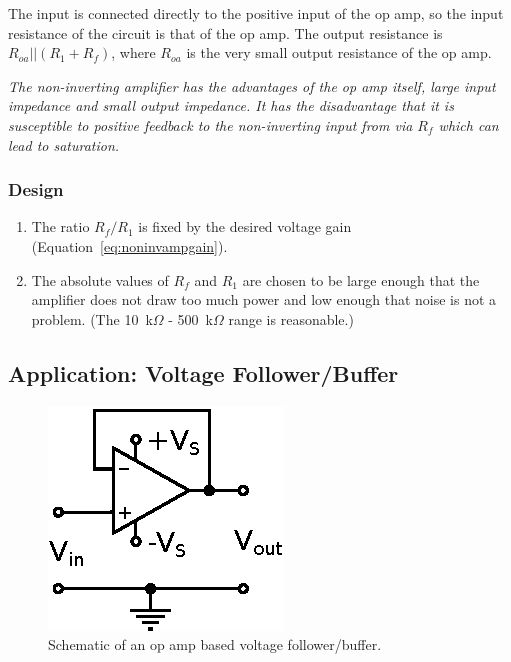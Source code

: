 \documentclass[11pt]{article}
\begin{document}
The input is connected directly to the positive input of the op amp,
so the input resistance of the circuit is that of the op amp. The
output resistance is $R_{oa}||(R_1 + R_f)$, where $R_{oa}$ is the very
small output resistance of the op amp.

\emph{The non-inverting amplifier has the advantages of the op amp
itself, large input impedance and small output impedance. It has the
disadvantage that it is susceptible to positive feedback to the
non-inverting input from via $R_f$ which can lead to saturation.}

\subsubsection*{Design}
\begin{enumerate}
\item The ratio $R_f/R_1$ is fixed by the desired voltage gain
  (Equation~\ref{eq:noninvampgain}).

\item The absolute values of $R_f$ and $R_1$ are chosen to be large
  enough that the amplifier does not draw too much power and low
  enough that noise is not a problem. (The 10~k$\Omega$ -
  500~k$\Omega$ range is reasonable.)
\end{enumerate}

\subsection{Application: Voltage Follower/Buffer}
\label{sec:vfollower}

\begin{figure}[h!]
  \begin{center}
    \includegraphics{vfollower.eps}
    \caption{Schematic of an op amp based voltage follower/buffer.}
    \label{fig:vfollower}
  \end{center}
\end{figure}
\end{document}
